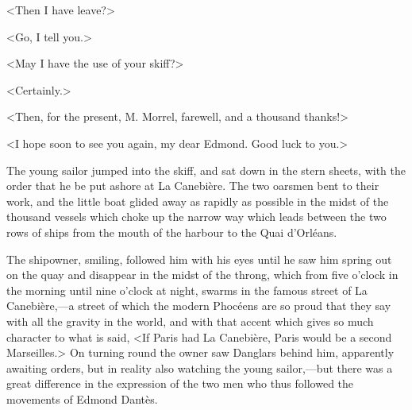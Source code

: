  <Then I have leave?> 

 <Go, I tell you.> 

 <May I have the use of your skiff?> 

 <Certainly.> 

 <Then, for the present, M. Morrel, farewell, and a thousand thanks!> 

 <I hope soon to see you again, my dear Edmond. Good luck to you.> 

 The young sailor jumped into the skiff, and sat down in the stern sheets, with the order that he be put ashore at La Canebière. The two oarsmen bent to their work, and the little boat glided away as rapidly as possible in the midst of the thousand vessels which choke up the narrow way which leads between the two rows of ships from the mouth of the harbour to the Quai d'Orléans. 

 The shipowner, smiling, followed him with his eyes until he saw him spring out on the quay and disappear in the midst of the throng, which from five o'clock in the morning until nine o'clock at night, swarms in the famous street of La Canebière,—a street of which the modern Phocéens are so proud that they say with all the gravity in the world, and with that accent which gives so much character to what is said, <If Paris had La Canebière, Paris would be a second Marseilles.> On turning round the owner saw Danglars behind him, apparently awaiting orders, but in reality also watching the young sailor,—but there was a great difference in the expression of the two men who thus followed the movements of Edmond Dantès. 